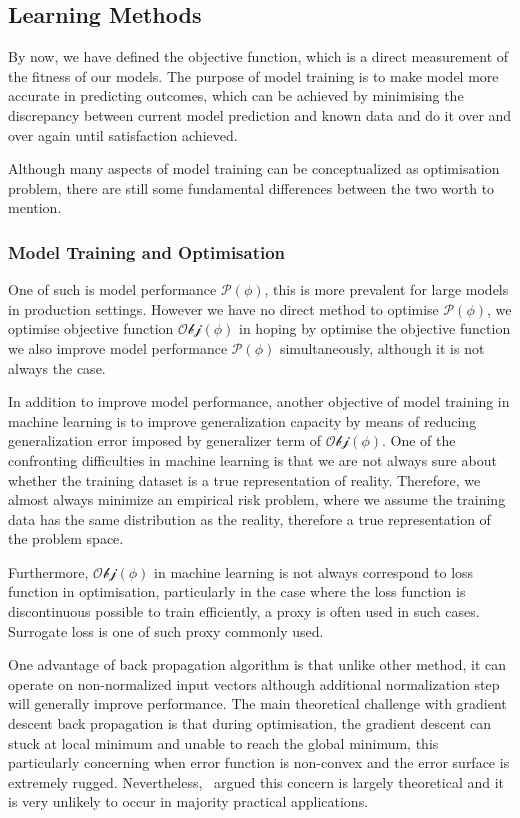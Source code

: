 \subsection {Learning Methods}
By now, we have defined the objective function, which is a direct measurement of the fitness of our models. The purpose of model training is to make model more accurate in predicting outcomes, which can be achieved by minimising the discrepancy between current model prediction and known data and do it over and over again until satisfaction achieved. 
\par 
Although many aspects of model training can be conceptualized as optimisation problem, there are still some fundamental differences between the two worth to mention. 
\par 
\subsubsection{Model Training and Optimisation}
One of such is model performance $\mathcal{P}(\phi)$, this is more prevalent for large models in production settings. However we have no direct method to optimise $\mathcal{P}(\phi)$, we optimise objective function $\mathcal{Obj}(\phi)$ in hoping by optimise the objective function we also improve model performance $\mathcal{P}(\phi)$ simultaneously, although it is not always the case.
\par 
In addition to improve model performance, another objective of model training in machine learning is to improve generalization capacity by means of reducing generalization error imposed by generalizer term of $\mathcal{Obj}(\phi)$. One of the confronting difficulties in machine learning is that we are not always sure about whether the training dataset is a true representation of reality. Therefore, we almost always minimize an empirical risk problem, where we assume the training data has the same distribution as the reality, therefore a true representation of the problem space. 
\par
Furthermore, $\mathcal{Obj}(\phi)$ in machine learning is not always correspond to loss function in optimisation, particularly in the case where the loss function is discontinuous   possible to train efficiently, a proxy is often used in such cases. Surrogate loss is one of such proxy commonly used. 

One advantage of back propagation algorithm is that unlike other method, it can operate on non-normalized input vectors although additional normalization step will generally improve performance. \cite{Buckland:2002} The main theoretical challenge with gradient descent back propagation is that during optimisation, the gradient descent can stuck at local minimum and unable to reach the global minimum, this particularly concerning when error function is non-convex and the error surface is extremely rugged. Nevertheless,~\citet{LeCun_2015} argued this concern is largely theoretical and it is very unlikely to occur in majority practical applications. 